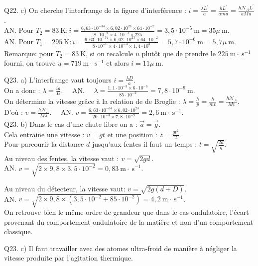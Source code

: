 \documentclass[10pt]{article}
\begin{document}
Q22. c) On cherche l'interfrange de la figure d'interférence : \(i=\frac{\lambda L^{\prime}}{a}=\frac{h L^{\prime}}{a m u}=\frac{h \mathcal{N}_{A} L^{\prime}}{a M u}\).\\
AN. Pour \(T_{2}=83 \mathrm{~K}: i=\frac{6,63 \cdot 10^{-34} \times 6,02 \cdot 10^{23} \times 64 \cdot 10^{-2}}{8 \cdot 10^{-6} \times 4 \cdot 10^{-3} \times 225}=3,5 \cdot 10^{-5} \mathrm{~m}=35 \mu \mathrm{~m}\).\\
AN. Pour \(T_{1}=295 \mathrm{~K}: i=\frac{6,63 \cdot 10^{-34} \times 6,02 \cdot 10^{23} \times 64 \cdot 10^{-2}}{8 \cdot 10^{-6} \times 4 \cdot 10^{-3} \times 1,4 \cdot 10^{3}}=5,7 \cdot 10^{-6} \mathrm{~m}=5,7 \mu \mathrm{~m}\).\\
Remarque: pour \(T_{2}=83 \mathrm{~K}\), si on recalcule \(u\) plutôt que de prendre le \(225 \mathrm{~m} \cdot \mathrm{~s}^{-1}\) fourni, on trouve \(u=719 \mathrm{~m} \cdot \mathrm{~s}^{-1}\) et alors \(i=11 \mu \mathrm{~m}\).

Q23. a) L'interfrange vaut toujours \(i=\frac{\lambda D}{a}\).\\
On a donc : \(\lambda=\frac{i a}{D} . \quad \underline{\text { AN. }} \quad \lambda=\frac{1,1 \cdot 10^{-3} \times 6 \cdot 10^{-6}}{85 \cdot 10^{-2}}=7,8 \cdot 10^{-9} \mathrm{~m}\).\\
On détermine la vitesse grâce à la relation de de Broglie : \(\lambda=\frac{h}{p}=\frac{h}{m v}=\frac{h \mathcal{N}_{A}}{M v}\).\\
D'où : \(v=\frac{h \mathcal{N}_{A}}{M \lambda} . \quad\) AN. \(v=\frac{6,63 \cdot 10^{-34} \times 6,02 \cdot 10^{23}}{20 \cdot 10^{-3} \times 7,8 \cdot 10^{-9}}=2,6 \mathrm{~m} \cdot \mathrm{~s}^{-1}\).\\
Q23. b) Dans le cas d'une chute libre on a : \(\vec{a}=\vec{g}\).\\
Cela entraine une vitesse : \(v=g t\) et une position : \(z=\frac{g t^{2}}{2}\).\\
Pour parcourir la distance \(d\) jusqu'aux fentes il faut un temps : \(t=\sqrt{\frac{2 d}{g}}\).\\
Au niveau des fentes, la vitesse vaut : \(v=\sqrt{2 g d}\).\\
AN. \(v=\sqrt{2 \times 9,8 \times 3,5 \cdot 10^{-2}}=0,83 \mathrm{~m} \cdot \mathrm{~s}^{-1}\).

Au niveau du détecteur, la vitesse vaut: \(v=\sqrt{2 g(d+D)}\).\\
AN. \(v=\sqrt{2 \times 9,8 \times\left(3,5 \cdot 10^{-2}+85 \cdot 10^{-2}\right)}=4,2 \mathrm{~m} \cdot \mathrm{~s}^{-1}\).\\
On retrouve bien le même ordre de grandeur que dans le cas ondulatoire, l'écart provenant du comportement ondulatoire de la matière et non d'un comportement classique.

Q23. c) Il faut travailler avec des atomes ultra-froid de manière à négliger la vitesse produite par l'agitation thermique.
\end{document}

